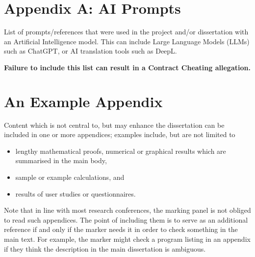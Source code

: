 \documentclass[ oneside,%
                    author={Michael Wray},
                    degree={BSc},
                     title={Some Structural Guidelines for CS Project Dissertations \\ With a Second Line Added to the Title},
                    unit={COMS30045},
                    subtitle={And Even A Fancy Subtitle}]{dissertation}
\begin{document}
\backmatter





\appendix

\chapter{Appendix A: AI Prompts}
\label{appx:ai_prompt}

List of prompts/references that were used in the project and/or dissertation with an Artificial Intelligence model. This can include Large Language Models (LLMs) such as ChatGPT, or AI translation tools such as DeepL.

\textbf{Failure to include this list can result in a Contract Cheating allegation.}

\chapter{An Example Appendix}
\label{appx:example}

Content which is not central to, but may enhance the dissertation can be 
included in one or more appendices; examples include, but are not limited
to

\begin{itemize}
\item lengthy mathematical proofs, numerical or graphical results which 
      are summarised in the main body,
\item sample or example calculations, 
      and
\item results of user studies or questionnaires.
\end{itemize}

\noindent
Note that in line with most research conferences, the marking panel is not
obliged to read such appendices. The point of including them is to serve as
an additional reference if and only if the marker needs it in order to check
something in the main text. For example, the marker might check a program listing 
in an appendix if they think the description in the main dissertation is ambiguous.

\end{document}
